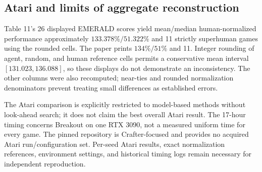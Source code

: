 \documentclass[10pt]{article}
\begin{document}
\subsection*{Atari and limits of aggregate reconstruction}
Table 11’s 26 displayed EMERALD scores yield mean/median human-normalized performance approximately \(133.378\%/51.322\%\) and 11 strictly superhuman games using the rounded cells. The paper prints \(134\%/51\%\) and 11. Integer rounding of agent, random, and human reference cells permits a conservative mean interval \([131.023,136.088]\), so these displays do not demonstrate an inconsistency. The other columns were also recomputed; near-ties and rounded normalization denominators prevent treating small differences as established errors.\par
The Atari comparison is explicitly restricted to model-based methods without look-ahead search; it does not claim the best overall Atari result. The 17-hour timing concerns Breakout on one RTX 3090, not a measured uniform time for every game. The pinned repository is Crafter-focused and provides no acquired Atari run/configuration set. Per-seed Atari results, exact normalization references, environment settings, and historical timing logs remain necessary for independent reproduction.\par
\end{document}
